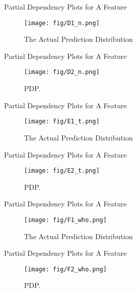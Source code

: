 \documentclass[10pt]{beamer}
\begin{document}
\begin{frame}{Partial Dependency Plots for A Feature}
  \begin{figure}[htbp]
    \centering
    \texttt{[image: fig/D1\_n.png]}
    \caption{The Actual Prediction Distribution}
  \end{figure}

\end{frame}

\begin{frame}{Partial Dependency Plots for A Feature}
  \begin{figure}[htbp]
    \centering
    \texttt{[image: fig/D2\_n.png]}
    \caption{PDP.}
  \end{figure}

\end{frame}

\begin{frame}{Partial Dependency Plots for A Feature}
  \begin{figure}[htbp]
    \centering
    \texttt{[image: fig/E1\_t.png]}
    \caption{The Actual Prediction Distribution}
  \end{figure}

\end{frame}

\begin{frame}{Partial Dependency Plots for A Feature}
  \begin{figure}[htbp]
    \centering
    \texttt{[image: fig/E2\_t.png]}
    \caption{PDP.}
  \end{figure}

\end{frame}

\begin{frame}{Partial Dependency Plots for A Feature}
  \begin{figure}[htbp]
    \centering
    \texttt{[image: fig/F1\_who.png]}
    \caption{The Actual Prediction Distribution}
  \end{figure}

\end{frame}

\begin{frame}{Partial Dependency Plots for A Feature}
  \begin{figure}[htbp]
    \centering
    \texttt{[image: fig/F2\_who.png]}
    \caption{PDP.}
  \end{figure}
\end{frame}
\end{document}
